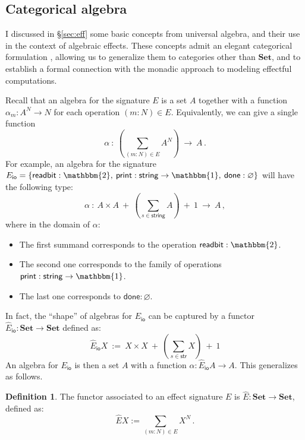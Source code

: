 \documentclass[11pt,oneside]{book}
\theoremstyle{definition}
\newtheorem{definition}[theorem]{Definition}
\newcommand{\kw}[1]{\ensuremath{ \mathsf{#1} }}
\begin{document}

\subsection{Categorical algebra} %

I discussed in \S\ref{sec:eff}
some basic concepts from universal algebra,
and their use in the context of algebraic effects.
These concepts admit
an elegant categorical formulation \citep{freemon},
allowing us to generalize them
to categories other than $\mathbf{Set}$,
and to establish a formal connection with
the monadic approach to modeling effectful computations.

Recall that an algebra for the signature $E$
is a set $A$ together with a function
$\alpha_m : A^N \rightarrow N$ for each operation
$(m \mathbin{:} N) \in E$.
Equivalently, we can give a single function
\[
  \alpha \: : \:
    \left( \sum_{(m \mathbin: N) \in E} A^N \right)
    \: \rightarrow \: A
  \,.
\]
For example,
an algebra for the signature
$E_\kw{io} =
\{ \kw{readbit} : \mathbbm{2}, \:
   \kw{print} : \kw{string} \rightarrow \mathbbm{1}, \:
   \kw{done} : \varnothing \}$
will have the following type:
\[
  \alpha \: : \:
    A \times A \: + \:
    \left( \sum_{s \in \kw{string}} A \right) \: + \:
    1 \: \rightarrow \: A
  \,,
\]
where in the domain of $\alpha$:
\begin{itemize}
  \item
    The first summand corresponds to the operation
    $\kw{readbit} : \mathbbm{2}$.
  \item
    The second one corresponds to the family of operations
    $\kw{print} : \kw{string} \rightarrow \mathbbm{1}$.
  \item
    The last one corresponds to $\kw{done} : \varnothing$.
\end{itemize}
In fact,
the ``shape'' of algebras for $E_\kw{io}$
can be captured by a functor
$\hat{E}_\kw{io} : \mathbf{Set} \rightarrow \mathbf{Set}$
defined as:
\[
  \hat{E}_\kw{io} X \: := \:
    X \times X \: + \:
    \left( \sum_{s \in \kw{str}} X \right) \: + \:
    1
\]
An algebra for $E_\kw{io}$ is then
a set $A$ with a function
$\alpha : \hat{E}_\kw{io} A \rightarrow A$.
This generalizes as follows.

\begin{definition}
The functor associated to an effect signature $E$
is $\hat{E} : \mathbf{Set} \rightarrow \mathbf{Set}$,
defined as:
\[
    \hat{E} X := \sum_{(m : N) \in E} X^N \,.
\]
\end{definition}
\end{document}
